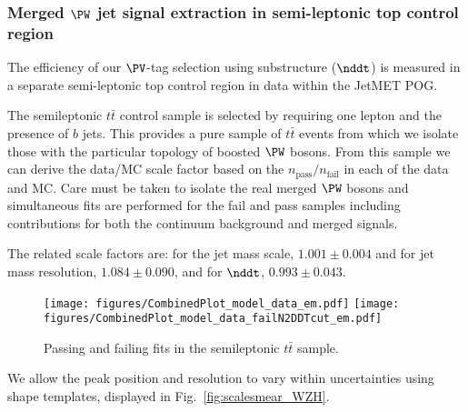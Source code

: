 \subsubsection{Merged $\PW$ jet signal extraction in semi-leptonic top control region}
\label{sec:sysWZ}

The efficiency of our $\PV$-tag selection using substructure ($\nddt$) is measured in a separate semi-leptonic top control region in data within the JetMET POG. 

The semileptonic $t\bar{t}$ control sample is selected by requiring one lepton and the presence of $b$ jets.
This provides a pure sample of $t\bar{t}$ events from which we isolate those with the particular topology of boosted $\PW$ bosons.
From this sample we can derive the data/MC scale factor based on the $n_\text{pass} / n_\text{fail}$ in each of the data and MC.
Care must be taken to isolate the real merged $\PW$ bosons and simultaneous fits are performed for the fail and pass samples including
contributions for both the continuum background and merged \PW signals.

The related scale factors are: for the jet mass scale, $1.001 \pm 0.004$ and for jet mass resolution, $1.084 \pm 0.090$, and for $\nddt$, $0.993 \pm 0.043$. 

\begin{figure}[hbtp]\begin{center}
    \texttt{[image: figures/CombinedPlot\_model\_data\_em.pdf]}
	\texttt{[image: figures/CombinedPlot\_model\_data\_failN2DDTcut\_em.pdf]}
    \caption{ Passing and failing fits in the semileptonic $t\bar{t}$ sample. }
 \label{fig:gbvmexpected}
 \end{center}
 \end{figure}

We allow the peak position and resolution to vary within uncertainties using shape templates, displayed in Fig.~\ref{fig:scalesmear_WZH}.

